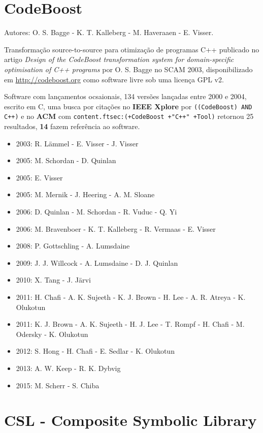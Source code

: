 \section{CodeBoost}

Autores:
O. S. Bagge - K. T. Kalleberg - M. Haveraaen - E. Visser.

Transformação source-to-source para otimização de programas C++
publicado no artigo {\it Design of the CodeBoost transformation system for domain-specific optimisation of C++ programs}
por O. S. Bagge
no SCAM 2003,
disponibilizado em \url{http://codeboost.org}
como software livre
sob uma licença GPL v2.

Software com lançamentos ocsaionais,
134 versões lançadas
entre 2000 e 2004,
escrito em C,
uma busca por citações no {\bf IEEE Xplore} por
\texttt{((CodeBoost) AND C++)}
e no {\bf ACM} com
\texttt{content.ftsec:(+CodeBoost +"C++" +Tool)}
retornou
25 resultados,
{\bf 14} fazem referência ao software.

\begin{itemize}
\item 2003: R. L\"{a}mmel - E. Visser - J. Visser
\item 2005: M. Schordan - D. Quinlan
\item 2005: E. Visser
\item 2005: M. Mernik - J. Heering - A. M. Sloane
\item 2006: D. Quinlan - M. Schordan - R. Vuduc - Q. Yi
\item 2006: M. Bravenboer - K. T. Kalleberg - R. Vermaas - E. Visser
\item 2008: P. Gottschling - A. Lumsdaine
\item 2009: J. J. Willcock - A. Lumsdaine - D. J. Quinlan
\item 2010: X. Tang - J. J\"{a}rvi
\item 2011: H. Chafi - A. K. Sujeeth - K. J. Brown - H. Lee - A. R. Atreya - K. Olukotun
\item 2011: K. J. Brown - A. K. Sujeeth - H. J. Lee - T. Rompf - H. Chafi - M. Odersky - K. Olukotun
\item 2012: S. Hong - H. Chafi - E. Sedlar - K. Olukotun
\item 2013: A. W. Keep - R. K. Dybvig
\item 2015: M. Scherr - S. Chiba
\end{itemize}

\section{CSL - Composite Symbolic Library}

